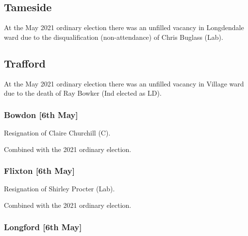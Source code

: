 \documentclass[a4paper,openany]{book}
\begin{document}
\begin{resultsiii}
\subsection*{Tameside}

At the May 2021 ordinary election there was an unfilled vacancy in Longdendale ward due to the disqualification (non-attendance) of Chris Buglass (Lab).

\subsection*{Trafford}

At the May 2021 ordinary election there was an unfilled vacancy in Village ward due to the death of Ray Bowker (Ind elected as LD).

\subsubsection*{Bowdon \hspace*{\fill}\nolinebreak[1]%
	\enspace\hspace*{\fill}
	[6th May]}


Resignation of Claire Churchill (C).

Combined with the 2021 ordinary election.

\subsubsection*{Flixton \hspace*{\fill}\nolinebreak[1]%
	\enspace\hspace*{\fill}
	[6th May]}


Resignation of Shirley Procter (Lab).

Combined with the 2021 ordinary election.

\subsubsection*{Longford \hspace*{\fill}\nolinebreak[1]%
	\enspace\hspace*{\fill}
	[6th May]}


\end{resultsiii}
\end{document}
